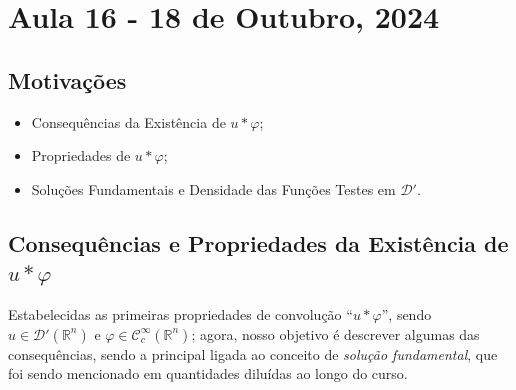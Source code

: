 \documentclass[../distribution_theory_notes.tex]{subfiles}
\begin{document}
\section{Aula 16 - 18 de Outubro, 2024}
\subsection{Motivações}
\begin{itemize}
	\item Consequências da Existência de \(u*\varphi \);
	\item Propriedades de \(u*\varphi \);
	\item Soluções Fundamentais e Densidade das Funções Testes em \(\mathcal{D}'\).
\end{itemize}
\subsection{Consequências e Propriedades da Existência de \(u*\varphi \)}
Estabelecidas as primeiras propriedades de convolução ``\(u*\varphi \)'', sendo \(u\in \mathcal{D}'(\mathbb{R}^{n})\) e \(\varphi\in \mathcal{C}_{c}^{\infty}(\mathbb{R}^{n}) \); agora, nosso objetivo é descrever algumas das consequências, sendo a principal ligada ao conceito de \textit{solução fundamental}, que foi sendo mencionado em quantidades diluídas ao longo do curso.
\end{document}
